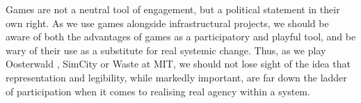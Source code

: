 \documentclass[nofonts,nols,justified,nobib]{tufte-book}
\begin{document}
Games are not a neutral tool of engagement, but a political statement in their own right. As we use games alongside infrastructural projects, we should be aware of both the advantages of games as a participatory and playful tool, and be wary of their use as a substitute for real systemic change. Thus, as we play Oosterwald \cite{play_the_city_play_2013}, SimCity or Waste at MIT, we should not lose sight of the idea that representation and legibility, while markedly important, are far down the ladder of participation when it comes to realising real agency within a system.

 
\end{document}
